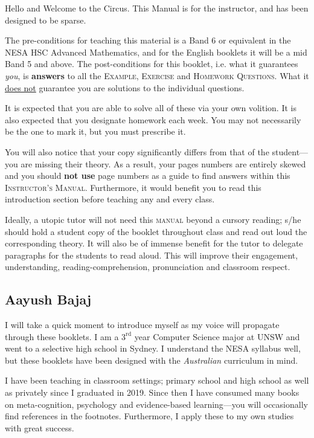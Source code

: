 \begin{instructor}
Hello and Welcome to the Circus. This Manual is for the instructor, and has been designed to be sparse.

    The pre-conditions for teaching this material is a Band 6 or equivalent in the NESA HSC Advanced Mathematics, and for the English booklets it will be a mid Band 5 and above. The post-conditions for this booklet, i.e. what it guarantees \emph{you}, is \textbf{answers} to all the \textsc{Example}, \textsc{Exercise} and \textsc{Homework Questions}. What it \underline{does not} guarantee you are solutions to the individual questions.

It is expected that you are able to solve all of these via your own volition. It is also expected that you designate homework each week. You may not necessarily be the one to mark it, but you must prescribe it.

    You will also notice that your copy significantly differs from that of the student---you are missing their theory. As a result, your pages numbers are entirely skewed and you should \textbf{not use} page numbers as a guide to find answers within this \textsc{Instructor's Manual}. Furthermore, it would benefit you to read this introduction section before teaching any and every class.

    Ideally, a utopic tutor will not need this \textsc{manual} beyond a cursory reading; s/he should hold a student copy of the booklet throughout class and read out loud the corresponding theory. It will also be of immense benefit for the tutor to delegate paragraphs for the students to read aloud. This will improve their engagement, understanding, reading-comprehension, pronunciation and classroom respect.

    \subsection{Aayush Bajaj}
    I will take a quick moment to introduce myself as my voice will propagate through these booklets. I am a $3^{\text{rd}}$ year Computer Science major at UNSW and went to a selective high school in Sydney. I understand the NESA syllabus well, but these booklets have been designed with the \emph{Australian} curriculum in mind.

    I have been teaching in classroom settings; primary school and high school as well as privately since I graduated in 2019. Since then I have consumed many books on meta-cognition, psychology and evidence-based learning---you will occasionally find references in the footnotes. Furthermore, I apply these to my own studies with great success.


\end{instructor}
